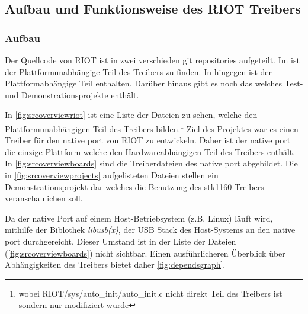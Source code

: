 \subsection{Aufbau und Funktionsweise des RIOT Treibers}
\subsubsection{Aufbau}
Der Quellcode von RIOT ist in zwei verschieden git repositories aufgeteilt. Im 
\riotrepo{} ist der Plattformunabhängige Teil des Treibers zu finden. In \boardsrepo{} hingegen ist der Plattformabhängige Teil enthalten. Darüber hinaus gibt es noch das \projectsrepo{} welches Test- und Demonstrationsprojekte enthält.

In \autoref{fig:srcoverviewriot} ist eine Liste der Dateien zu sehen, welche den Plattformunabhängigen Teil des Treibers bilden.\footnote{wobei RIOT/sys/auto\_init/auto\_init.c nicht direkt Teil des Treibers ist sondern nur modifiziert wurde} Ziel des Projektes war es einen Treiber für den native port von RIOT zu entwickeln. Daher ist der native port die einzige Plattform welche den Hardwareabhängigen Teil des Treibers enthält. In \autoref{fig:srcoverviewboards} sind die Treiberdateien des native port abgebildet. Die in \autoref{fig:srcoverviewprojects} aufgelisteten Dateien stellen ein Demonstrationsprojekt dar welches die Benutzung des stk1160 Treibers veranschaulichen soll. 

Da der native Port auf einem Host-Betriebsystem (z.B. Linux) läuft wird, mithilfe der Biblothek \emph{libusb(x)}, der USB Stack des Host-Systems an den native port durchgereicht. Dieser Umstand ist in der Liste der Dateien (\autoref{fig:srcoverviewboards}) nicht sichtbar. Einen ausführlicheren Überblick über Abhängigkeiten des Treibers bietet daher \autoref{fig:dependsgraph}.


